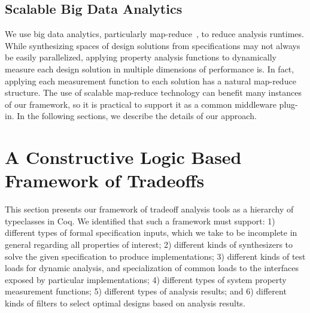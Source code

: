 \documentclass{sig-alternate}
\begin{document}

\subsection{Scalable Big Data Analytics}
We use big data analytics, particularly map-reduce~\cite{dean2008mapreduce}, to reduce analysis runtimes. %
While synthesizing spaces of design solutions from specifications may not always be easily parallelized,
applying property analysis functions to dynamically measure each design solution in multiple dimensions of performance is. In fact, applying each measurement function to each solution has a natural map-reduce structure. The use of scalable map-reduce technology can benefit many instances of our framework, so it is practical to support it as a common middleware plug-in.
In the following sections, we describe the details of our approach.

\section{A Constructive Logic Based Framework of Tradeoffs}
\label{framework}
This section presents our framework of tradeoff analysis tools as a hierarchy of typeclasses in Coq. We identified that such a framework must support: 1) different types of formal specification inputs, which we take to be incomplete in general regarding all properties of interest; 2) different kinds of synthesizers to solve the given specification to produce implementations; 3) different kinds of test loads for dynamic analysis, and specialization of common loads to the interfaces exposed by particular implementations; 4) different types of system property measurement functions; 5) different types of analysis results; and 6) different kinds of filters to select optimal designs based on analysis results.
\end{document}
